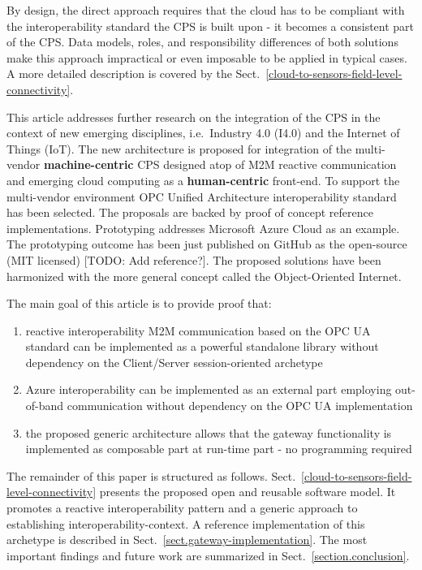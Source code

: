 \documentclass{jacsart}
\begin{document}
By design, the direct approach requires that the cloud has to be compliant with the interoperability standard the CPS is built upon - it becomes a consistent part of the CPS. Data models, roles, and responsibility differences of both solutions make this approach impractical or even imposable to be applied in typical cases. A more detailed description is covered by the Sect.~\ref*{cloud-to-sensors-field-level-connectivity}.

This article addresses further research on the integration of the CPS in the context of new emerging disciplines, i.e.~Industry 4.0 (I4.0) and the Internet of Things (IoT). The new architecture is proposed for integration of the multi-vendor \textbf{machine-centric} CPS designed atop of M2M reactive communication and emerging cloud computing as a \textbf{human-centric} front-end. To support the multi-vendor environment OPC Unified Architecture \cite{LiteratureSurveyOnOpenPlatformCommunications} interoperability standard has been selected. The proposals are backed by proof of concept reference implementations. Prototyping addresses Microsoft Azure Cloud as an example. The prototyping outcome has been just published on GitHub as the open-source (MIT licensed) [TODO: Add reference?]. The proposed solutions have been harmonized with the more general concept called the Object-Oriented Internet.

The main goal of this article is to provide proof that:

\begin{enumerate}
      \item  reactive interoperability M2M communication based on the OPC UA standard can be implemented as a powerful standalone library without dependency on the Client/Server session-oriented archetype
      \item Azure interoperability can be implemented as an external part employing out-of-band communication without dependency on the OPC UA implementation
      \item the proposed generic architecture allows that the gateway functionality is implemented as composable part at run-time part - no programming required
\end{enumerate}

The remainder of this paper is structured as follows. Sect.~\ref*{cloud-to-sensors-field-level-connectivity} presents the proposed open and reusable software model. It promotes a reactive interoperability pattern and a generic approach to establishing interoperability-context. A reference implementation of this archetype is described in Sect.~\ref*{sect.gateway-implementation}. The most important findings and future work are summarized in Sect.~\ref*{section.conclusion}.
\end{document}
